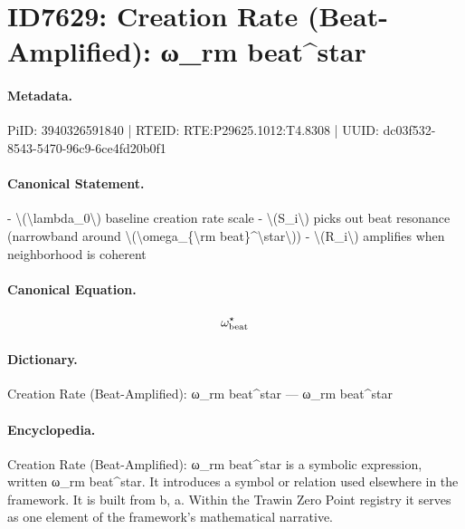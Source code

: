 \section*{ID7629: Creation Rate (Beat-Amplified): ω\_rm beat\textasciicircum{}star}
\paragraph{Metadata.}
PiID: 3940326591840 | RTEID: RTE:P29625.1012:T4.8308 | UUID: dc03f532-8543-5470-96c9-6ce4fd20b0f1

\paragraph{Canonical Statement.}
- \textbackslash{}(\textbackslash{}lambda\_0\textbackslash{}) baseline creation rate scale - \textbackslash{}(S\_i\textbackslash{}) picks out beat resonance (narrowband around \textbackslash{}(\textbackslash{}omega\_\{\textbackslash{}rm beat\}\textasciicircum{}\textbackslash{}star\textbackslash{})) - \textbackslash{}(R\_i\textbackslash{}) amplifies when neighborhood is coherent

\paragraph{Canonical Equation.}
\[
\omega_{\rm beat}^\star
\]

\paragraph{Dictionary.}
Creation Rate (Beat-Amplified): ω\_rm beat\textasciicircum{}star — ω\_rm beat\textasciicircum{}star

\paragraph{Encyclopedia.}
Creation Rate (Beat-Amplified): ω\_rm beat\textasciicircum{}star is a symbolic expression, written ω\_rm beat\textasciicircum{}star. It introduces a symbol or relation used elsewhere in the framework. It is built from b, a. Within the Trawin Zero Point registry it serves as one element of the framework's mathematical narrative.
